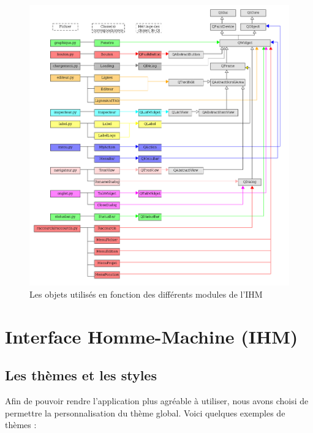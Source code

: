 \documentclass[a4paper,12pt]{article}
\begin{document}
	\begin{figure}[h!]
		\begin{center}
			\includegraphics[scale=0.46]{images/imgs_uml/new_relation_Qt.png}
				\caption{Les objets utilisés en fonction des différents modules de l'IHM}
		\end{center}
	\end{figure}
		
\newpage

\section{Interface Homme-Machine (IHM)}
		
	\subsection{Les thèmes et les styles}
	
	Afin de pouvoir rendre l'application plus agréable à utiliser, nous avons choisi de permettre la personnalisation du thème global.
	Voici quelques exemples de thèmes : 
	
\end{document}
